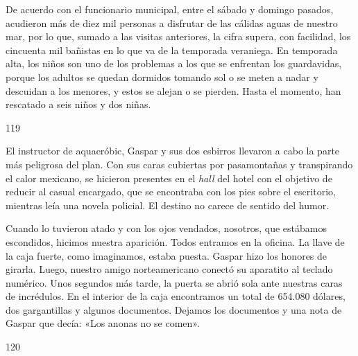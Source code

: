 \documentclass[12pt,twoside,openright,a5paper]{book}
\begin{document}
De acuerdo con el funcionario municipal, entre el sábado y domingo pasados,
acudieron más de diez mil personas a disfrutar de las cálidas aguas de
nuestro mar, por lo que, sumado a las visitas anteriores, la cifra supera,
con facilidad, los cincuenta mil bañistas en lo que va de la temporada
veraniega. En temporada alta, los niños
son uno de los problemas a los que se enfrentan los guardavidas, porque
los adultos se quedan dormidos tomando sol o se meten a nadar y descuidan a
los menores, y estos se alejan o se pierden. Hasta el momento, han rescatado
a seis niños y dos niñas.

\vspace{0.5cm}

\hrulefill \hspace{0.1cm}\decofourleft\hspace{0.2cm} 119 \hspace{0.2cm}\decofourright \hspace{0.1cm}\hrulefill

\nopagebreak

\vspace{0.5cm}

\nopagebreak

El instructor de
aquaeróbic, Gaspar y sus dos esbirros llevaron a cabo
la parte más peligrosa del plan. Con sus caras cubiertas por
pasamontañas y transpirando el calor mexicano, se hicieron presentes en
el \emph{hall} del hotel con el objetivo de reducir al casual encargado, que se
encontraba con los pies sobre el escritorio, mientras leía una novela policial. El
destino no carece de sentido del humor.

Cuando lo tuvieron atado y con los ojos vendados, nosotros, que estábamos
escondidos, hicimos nuestra aparición. Todos entramos en la oficina. La llave
de la caja fuerte, como imaginamos, estaba puesta. Gaspar hizo los honores
de girarla. Luego, nuestro amigo norteamericano conectó su aparatito al
teclado numérico. Unos segundos más tarde, la puerta se abrió sola ante
nuestras caras de incrédulos. En el interior de la caja encontramos un
total de 654.080 dólares, dos gargantillas y algunos documentos. Dejamos
los documentos y una nota de Gaspar que decía: «Los anonas no se comen».


\vspace{0.5cm}

\hrulefill \hspace{0.1cm}\decofourleft\hspace{0.2cm} 120 \hspace{0.2cm}\decofourright \hspace{0.1cm}\hrulefill
\end{document}
